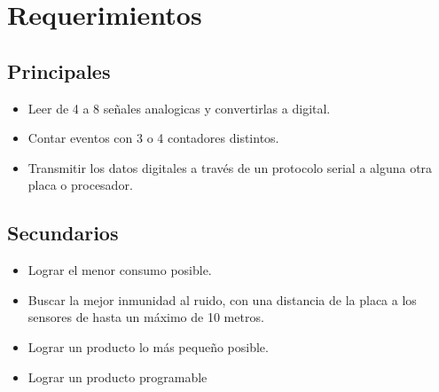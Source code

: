 \section{Requerimientos}
\subsection{Principales}
\begin{itemize}
  \item Leer de 4 a 8 se\~nales analogicas y convertirlas a digital.
  \item Contar eventos con 3 o 4 contadores distintos.
  \item Transmitir los datos digitales a través de un protocolo serial a alguna otra placa o procesador.
\end{itemize}


\subsection{Secundarios}
\begin{itemize}
  \item Lograr el menor consumo posible.
  \item Buscar la mejor inmunidad al ruido, con una distancia de la placa a los sensores de hasta un máximo de 10 metros.
  \item Lograr un producto lo más peque\~no posible.
  \item Lograr un producto programable
\end{itemize}
